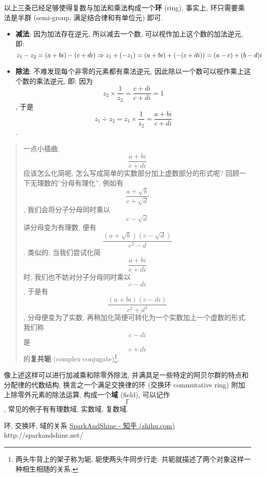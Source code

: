 以上三条已经足够使得复数与加法和乘法构成一个\textbf{环} (ring), 事实上,
环只需要乘法是半群 (semi-group, 满足结合律和有单位元) 即可.

\begin{itemize}
\tightlist
\item
  \textbf{减法}: 因为加法存在逆元, 所以减去一个数,
  可以视作加上这个数的加法逆元, 即:
  \[z_1-z_2=(a+bi)-(c+di)\\\Rightarrow z_1+(-z_1)=(a+bi)+(-(c+di))=(a-c)+(b-d)i\]
\item
  \textbf{除法}: 不难发现每个非零的元素都有乘法逆元,
  因此除以一个数可以视作乘上这个数的乘法逆元, 即: 因为
  \[z_2\times\frac{1}{z_2}=\frac{c+di}{c+di}=1\], 于是
  \[z_1\div z_2=z_1\times\frac{1}{z_2}=\frac{a+bi}{c+di}\].
\end{itemize}

\begin{quote}
一点小插曲, \[\frac{a+bi}{c+di}\] 应该怎么化简呢,
怎么写成简单的实数部分加上虚数部分的形式呢?
回顾一下无理数的''分母有理化'', 例如有
\[\frac{a+\sqrt{b}}{c+\sqrt{d}}\], 我们会将分子分母同时乘以
\[c-\sqrt{d}\] 讲分母变为有理数, 便有
\[\frac{(a+\sqrt{b})(c-\sqrt{d})}{c^2-d}\]. 类似的, 当我们尝试化简
\[\frac{a+bi}{c+di}\]时, 我们也不妨对分子分母同时乘以 \[c-di\], 于是有
\[\frac{(a+bi)(c-di)}{c^2+d^2}\], 分母便变为了实数,
再稍加化简便可转化为一个实数加上一个虚数的形式. 我们称 \[c-di\] 是
\[c+di\] 的\textbf{复共轭} (complex conjugate)\footnote{两头牛背上的架子称为轭,
  轭使两头牛同步行走. 共轭就描述了两个对象这样一种相生相随的关系.}.
\end{quote}

像上述这样可以进行加减乘和除零外除法,
并满具足一些特定的阿贝尔群的特点和分配律的代数结构,
换言之一个满足交换律的环 (交换环 commutative ring)
附加上除零外元素的除法运算, 构成一个\textbf{域} (field), 可以记作
\[\mathbb{F}\], 常见的例子有有理数域, 实数域, 复数域.

环, 交换环, 域的关系
\href{https://www.zhihu.com/people/SparkandShine}{SparkAndShine - 知乎
(zhihu.com)} http://sparkandshine.net/
